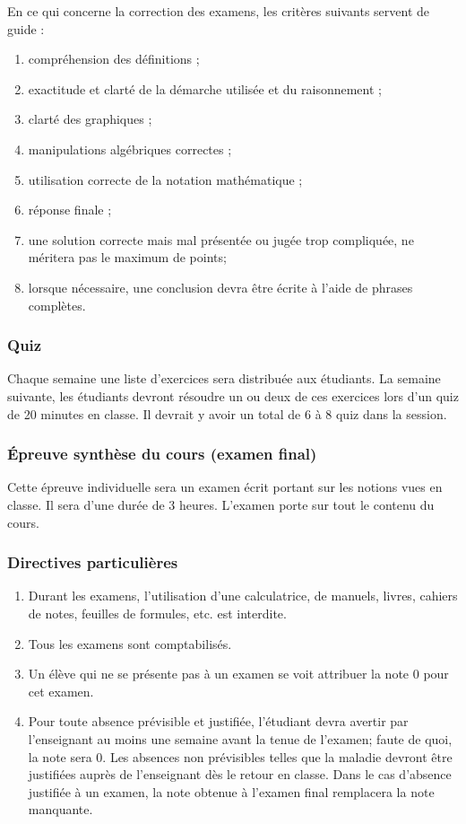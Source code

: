 \documentclass[fleqn,twoside,12pt,letterpaper]{article}
\begin{document}
En ce qui concerne la correction des examens,  les critères suivants servent de guide : 
\begin{enumerate}
  \item compréhension des définitions ;
  \item exactitude et clarté de la démarche utilisée et du raisonnement ;
  \item clarté des graphiques ;
  \item manipulations algébriques correctes ;
  \item utilisation correcte de la notation mathématique ;
  \item réponse finale ;
  \item une solution correcte mais mal présentée ou jugée trop compliquée, ne méritera pas le maximum de points;
  \item lorsque nécessaire, une conclusion devra être écrite à l'aide de  phrases complètes.
\end{enumerate}

\subsubsection{Quiz}

Chaque semaine une liste d'exercices sera distribuée aux étudiants. La semaine suivante, les étudiants devront résoudre un ou deux de ces exercices lors d'un quiz de 20 minutes en classe. Il devrait y avoir un total de 6 à 8 quiz dans la session.


\subsubsection{Épreuve synthèse du cours (examen final)}

Cette épreuve individuelle sera un examen écrit portant sur les notions vues en classe.  Il sera d'une durée de 3 heures.  L'examen porte sur tout le contenu du cours.

\subsubsection{Directives particulières}

\begin{enumerate}
\item Durant les examens, l'utilisation d'une calculatrice, de manuels, livres, cahiers de notes, feuilles de formules, etc. est interdite.
\item Tous les examens sont comptabilisés.
\item Un élève qui ne se présente pas à un examen se voit attribuer la note 0 pour cet examen.
\item Pour toute absence prévisible et justifiée, l'étudiant devra avertir par l'enseignant au moins une semaine avant la tenue de l'examen; faute de quoi, la note sera 0.  Les absences non prévisibles telles que la maladie devront être justifiées auprès de l'enseignant dès le retour en classe.  Dans le cas d'absence justifiée à un examen, la note obtenue à l'examen final remplacera la note manquante.
\end{enumerate}
 
\end{document}
